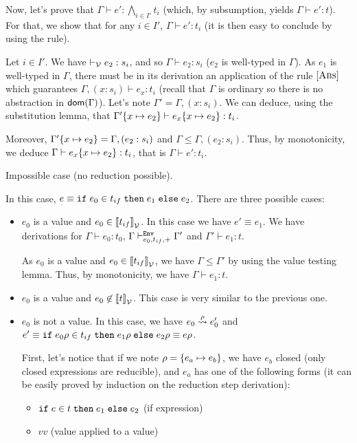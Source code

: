\documentclass[a4paper]{article}
\theoremstyle{definition}
\begin{document}
\begin{description}
\begin{itemize}
            Now, let's prove that $\Gamma \vdash e':\bigwedge_{i\in I'} t_i$ (which, by subsumption,
            yields $\Gamma \vdash e': t$). For that, we show that for any $i\in I'$, $\Gamma \vdash e':t_i$
            (it is then easy to conclude by using the  rule).

            Let $i\in I'$. We have $\vvdash e_2:s_i$, and so $\Gamma \vdash e_2:s_i$ ($e_2$ is well-typed in $\Gamma$).
            As $e_1$ is well-typed in $\Gamma$, there must be in its derivation an application of the rule $\Rule{Abs}$
            which guarantees $\Gamma,(x:s_i) \vdash e_x:t_i$ (recall that $\Gamma$ is ordinary so there is no abstraction in $\dom\Gamma$).
            Let's note $\Gamma'=\Gamma,(x:s_i)$.
            We can deduce, using the substitution lemma, that $\Gamma'\subst x {e_2} \vdash e_x\subst x {e_2}: t_i$.
           
            Moreover, $\Gamma'\subst x {e_2} = \Gamma,(e_2:s_i)$ and $\Gamma \leq \Gamma,(e_2:s_i)$.
            Thus, by monotonicity, we deduce $\Gamma \vdash e_x\subst x {e_2}: t_i$,
            that is $\Gamma \vdash e': t_i$.
          \end{itemize}
          \item[\Rule{Abs}] Impossible case (no reduction possible).
          \item[\Rule{If}] In this case, $e\equiv \ite {e_0} {t_{if}} {e_1} {e_2}$. There are three possible cases:
          \begin{itemize}
            \item $e_0$ is a value and $e_0 \in \valsemantic{t_{if}}$. In this case we have $e' \equiv e_1$.
            We have derivations for $\Gamma \vdash e_0: t_0$, $\Gamma \evdash + {e_0} {t_{if}} \Gamma'$ and $\Gamma'\vdash e_1:t$.
            
            As $e_0$ is a value and $e_0 \in \valsemantic{t_{if}}$, we have $\Gamma\leq\Gamma'$ by using the value testing lemma.
            Thus, by monotonicity, we have $\Gamma\vdash e_1:t$.
            \item $e_0$ is a value and $e_0 \not\in \valsemantic{t}$. This case is very similar to the previous one.
            \item $e_0$ is not a value.
            In this case, we have $e_0\xleadsto{\rho} e_0'$ and $e'\equiv \ite {e_0\rho} {t_{if}} {e_1\rho} {e_2\rho}\equiv e\rho$.
            
            First, let's notice that if we note $\rho=\subst{e_a}{e_b}$, we have $e_b$ closed (only closed expressions are reducible),
            and $e_a$ has one of the following forms (it can be easily proved by induction on the reduction step derivation):
            \begin{itemize}
              \item $\ite e t {e_1} {e_2}$ (if expression)
              \item $v v$ (value applied to a value)
            \end{itemize}


\end{itemize}
\end{description}
\end{document}

